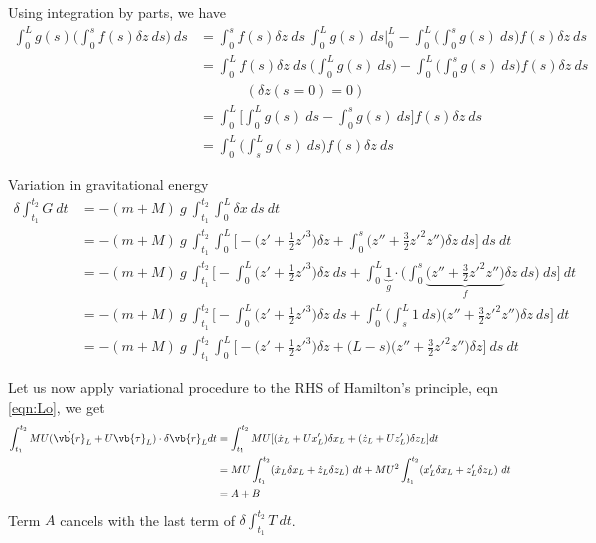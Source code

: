 \begin{mdframed}
	Using integration by parts, we have
	\begin{align*}
	 \int_0^L g (s) \bigg(\int_0^s f(s)\delta z~ds\bigg)~ds &= \int_0^s f(s)\delta z ~ds~\int_0^L g(s)~ds\bigg|_0^L - \int_0^L \bigg(\int_0^s g(s)~ds\bigg) f(s)\delta z ~ds \\
	  &= \int_0^L f(s)\delta z ~ds~\bigg(\int_0^L g(s)~ds\bigg) - \int_0^L \bigg(\int_0^s g(s)~ds\bigg) f(s)\delta z ~ds \\ 
	  &\phantom{=}\qquad (\delta z (s=0) = 0) \\
	  &= \int_0^L \bigg[\int_0^L g(s)~ds - \int_0^s g(s)~ds\bigg]f(s)\delta z ~ds \\ 
	  &= \int_0^L \bigg(\int_s^L g(s)~ds\bigg)f(s)\delta z ~ds
   	\end{align*}
\end{mdframed}
Variation in gravitational energy
\begin{align*}
\delta \int_{t_1}^{t_2} G~dt &=  -(m + M)~g~\int_{t_1}^{t_2} \int_0^L \delta x~ds~dt \\
    &= -(m + M)~g~\int_{t_1}^{t_2} \int_0^L \bigg[- \bigg(z' + \frac{1}{2}{z'}^3\bigg)\delta z + \int_0^s \bigg(z'' + \frac{3}{2}{z'}^2z''\bigg)\delta z~ds\bigg]~ds~dt \\
    &= -(m + M)~g~\int_{t_1}^{t_2}  \bigg[- \int_0^L\bigg(z' + \frac{1}{2}{z'}^3\bigg)\delta z~ds + \int_0^L \underbrace{1}_{g} \cdot \bigg(\int_0^s \underbrace{\bigg(z'' + \frac{3}{2}{z'}^2z''\bigg)}_{f}\delta z~ds\bigg)~ds\bigg]~dt \\
    &= -(m + M)~g~\int_{t_1}^{t_2}  \bigg[- \int_0^L\bigg(z' + \frac{1}{2}{z'}^3\bigg)\delta z~ds + \int_0^L \bigg(\int_s^L 1~ds\bigg)\bigg(z'' + \frac{3}{2}{z'}^2z''\bigg)\delta z~ds\bigg]~dt \\
    &= -(m + M)~g~\int_{t_1}^{t_2} \int_0^L \bigg[- \bigg(z' + \frac{1}{2}{z'}^3\bigg)\delta z +  \bigg(L - s\bigg)\bigg(z'' + \frac{3}{2}{z'}^2z''\bigg)\delta z\bigg]~ds~dt
\end{align*}

Let us now apply variational procedure to the RHS of Hamilton's principle, eqn \ref{eqn:Lo}, we get
\begin{align*}
  \int_{t_1}^{t_2}  MU (\dot{\vb{r}}_L + U\vb{\tau}_L)\cdot \delta\vb{r}_L  dt &=  \int_{t_1}^{t_2}  MU [(\dot{x}_L + Ux_L')\delta x_L + (\dot{z}_L + Uz_L')\delta z_L]  dt \\
  &= MU \int_{t_1}^{t_2} (\dot{x}_L \delta x_L + \dot{z}_L \delta z_L)~dt + MU^2 \int_{t_1}^{t_2} (x_L' \delta x_L + z_L' \delta z_L)~dt \\
  &= A + B
\end{align*}
Term $A$ cancels with the last term of $\delta \int_{t_1}^{t_2} T~dt$.

